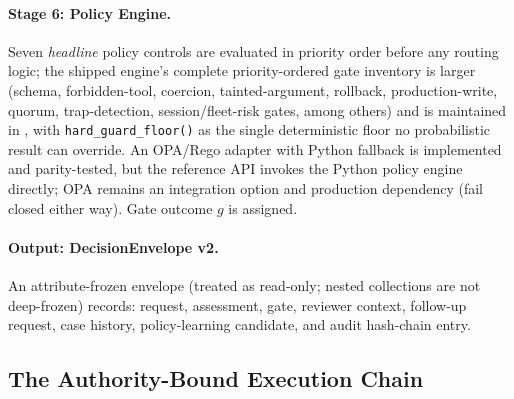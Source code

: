 \documentclass[10pt,twocolumn]{article}
\begin{document}
\paragraph{Stage 6: Policy Engine.}
Seven \emph{headline} policy controls are evaluated in priority order
before any routing logic; the shipped engine's complete priority-ordered
gate inventory is larger (schema, forbidden-tool, coercion, tainted-argument,
rollback, production-write, quorum, trap-detection, session/fleet-risk
gates, among others) and is maintained in
, with \texttt{hard\_guard\_floor()}
as the single deterministic floor no probabilistic result can override. An OPA/Rego adapter with Python fallback is implemented and
parity-tested, but the reference API invokes the Python policy engine
directly; OPA remains an integration option and production dependency
(fail closed either way). Gate outcome $g$ is assigned.

\paragraph{Output: DecisionEnvelope v2.}
An attribute-frozen envelope (treated as read-only; nested collections
are not deep-frozen) records: request, assessment, gate, reviewer
context, follow-up request, case history, policy-learning candidate,
and audit hash-chain entry.


\subsection{The Authority-Bound Execution Chain}
\label{sec:execution-chain}
\end{document}
